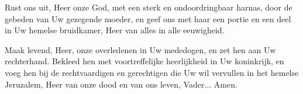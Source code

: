 \documentclass[12pt,twoside,a5paper]{article}
\begin{document}
\begin{halfparskip}
   Rust ons uit, Heer onze God, met een sterk en ondoordringbaar harnas, door de gebeden van Uw gezegende moeder, en geef ons met haar een portie en een deel in Uw hemelse bruidkamer, Heer van alles in alle eeuwigheid.
\end{halfparskip}

\begin{halfparskip}
   Maak levend, Heer, onze overledenen in Uw mededogen, en zet hen aan Uw rechterhand. Bekleed hen met voortreffelijke heerlijkheid in Uw koninkrijk, en voeg hen bij de rechtvaardigen en gerechtigen die Uw wil vervullen in het hemelse Jeruzalem, Heer van onze dood en van ons leven, Vader... Amen.
\end{halfparskip}



\end{document}
